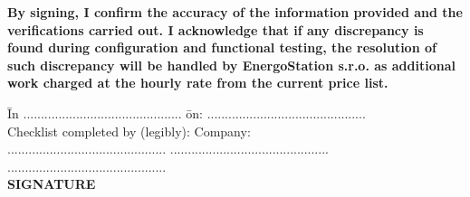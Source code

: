     \textbf{By signing, I confirm the accuracy of the information provided and the verifications carried out. I acknowledge that if any discrepancy is found during configuration and functional testing, the resolution of such discrepancy will be handled by EnergoStation s.r.o. as additional work charged at the hourly rate from the current price list.}

    \vskip0.2in
    \begin{tabbing}
	\hspace{0em} \= In .............................................  \hspace{6em} \= on: ............................................. \\[0.5cm]
	\> Checklist completed by (legibly):   \> Company:  \\[0.5cm]
    \> .............................................   \> .............................................  \\[1.5cm]
	\>   \> .............................................  \\[0.2cm]
	\hspace{25em} \= \textbf{SIGNATURE} \\
	\end{tabbing}
